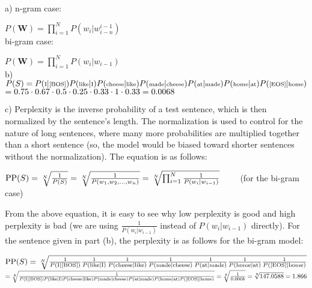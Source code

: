 \begin{solution} \ \\
	a) n-gram case:
	
	$P(\textbf{W}) = \prod_{i=1}^{N} P(w_i | w_{i-n}^{i-1})$\\
	
	bi-gram case:
	
	$P(\textbf{W}) = \prod_{i=1}^{N} P(w_i | w_{i-1})$\\
	
	b) $\scriptsize P(S) = P(\text{I} \vert \text{[BOS]}) P(\text{like} \vert \text{I})P(\text{cheese} \vert \text{like}) P(\text{made} \vert \text{cheese}) P(\text{at} \vert \text{made}) P(\text{home} \vert \text{at}) P(\text{[EOS]} \vert \text{home})$\\
	$= 0.75 \cdot 0.67 \cdot 0.5 \cdot 0.25 \cdot 0.33 \cdot 1 \cdot 0.33\\
	= 0.0068$
	
	c) Perplexity is the inverse probability of a test sentence, which is then normalized by the sentence's length. The normalization is used to control for the nature of long sentences, where many more probabilities are multiplied together than a short sentence (so, the model would be biased toward shorter sentences without the normalization). The equation is as follows:
	
	$\text{PP}(S) = \sqrt[N]{\frac{1}{P(S)}} = \sqrt[N]{\frac{1}{P(w_1, w_2, \dots, w_n)}}\\
	= \sqrt[N]{\prod_{i=1}^{N}\frac{1}{P(w_i \vert w_{i-1})}} \qquad$ (for the bi-gram case)
	
	From the above equation, it is easy to see why low perplexity is good and high perplexity is bad (we are using $\frac{1}{P(w_i \vert w_{i-1})}$ instead of $P(w_i \vert w_{i-1})$ directly). For the sentence given in part (b), the perplexity is as follows for the bi-gram model:
	
	$\text{PP}(S) = \sqrt[N]{\frac{1}{P(\text{I} \vert \text{[BOS]})}\frac{1}{P(\text{like} \vert \text{I})}\frac{1}{P(\text{cheese} \vert \text{like})}\frac{1}{P(\text{made} \vert \text{cheese})}\frac{1}{P(\text{at} \vert \text{made})}\frac{1}{P(\text{home} \vert \text{at})}\frac{1}{P(\text{[EOS]} \vert \text{home})}}\\$
	$= \sqrt[8]{\frac{1}{P(\text{I} \vert \text{[BOS]}) P(\text{like} \vert \text{I})P(\text{cheese} \vert \text{like}) P(\text{made} \vert \text{cheese}) P(\text{at} \vert \text{made}) P(\text{home} \vert \text{at}) P(\text{[EOS]} \vert \text{home})}}\\
	= \sqrt[8]{\frac{1}{0.0068}}\\
	= \sqrt[8]{147.0588}\\
	= 1.866$\\


\end{solution}
